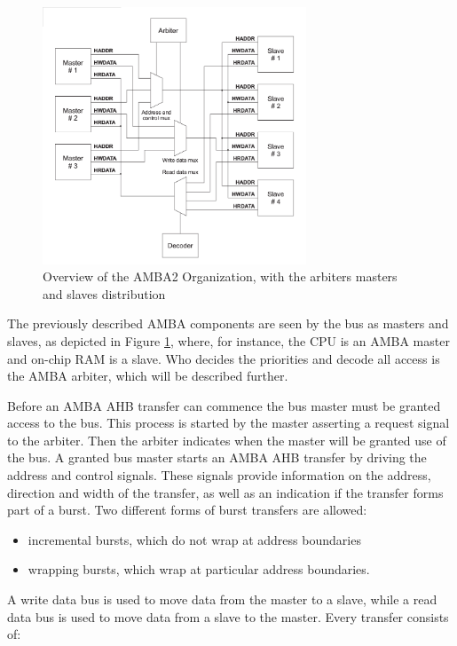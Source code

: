 \begin{figure}[ht]
    \centering
    \includegraphics[width=0.7\textwidth]{figures/others/multiplex.png}
    \caption{Overview  of the AMBA2 Organization, with the arbiters masters and slaves distribution}
    \label{fig:internorg}
\end{figure}
The previously described AMBA components are seen by the bus as masters and slaves, as depicted in Figure \ref{fig:internorg}, where, for instance, the CPU is an AMBA master and on-chip RAM is a slave. Who decides the priorities and decode all access  is the AMBA arbiter, which will be described further.

Before an AMBA AHB transfer can commence the bus master must be granted access to the bus. This process is started by the master asserting a request signal to the arbiter. Then the arbiter indicates when the master will be granted use of the bus. A granted bus master starts an AMBA AHB transfer by driving the address and control signals. These signals provide information on the address, direction and width of the transfer, as well as an indication if the transfer forms part of a burst. Two different forms of burst transfers are allowed:
\begin{itemize}
\item incremental bursts, which do not wrap at address boundaries
\item wrapping bursts, which wrap at particular address boundaries.
\end{itemize}

A write data bus is used to move data from the master to a slave, while a read data bus
is used to move data from a slave to the master.
Every transfer consists of:

